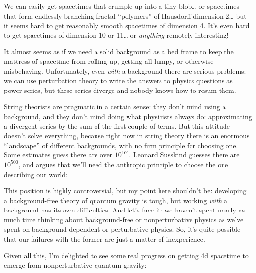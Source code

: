 \documentclass{article}
\def\tightlist{}
\renewcommand{\texttt}[1]{%
  \begingroup
  \ttfamily
  \begingroup\lccode`~=`/\lowercase{\endgroup\def~}{/\discretionary{}{}{}}%
  \begingroup\lccode`~=`[\lowercase{\endgroup\def~}{[\discretionary{}{}{}}%
  \begingroup\lccode`~=`.\lowercase{\endgroup\def~}{.\discretionary{}{}{}}%
  \catcode`/=\active\catcode`[=\active\catcode`.=\active
  \scantokens{#1\noexpand}%
  \endgroup
}
\begin{document}
We can easily get spacetimes that crumple up into a tiny blob\ldots{} or
spacetimes that form endlessly branching fractal ``polymers'' of
Hausdorff dimension 2\ldots{} but it seems hard to get reasonably smooth
spacetimes of dimension 4. It's even hard to get spacetimes of dimension
10 or 11\ldots{} or \emph{anything} remotely interesting!

It almost seems as if we need a solid background as a bed frame to keep
the mattress of spacetime from rolling up, getting all lumpy, or
otherwise misbehaving. Unfortunately, even \emph{with} a background
there are serious problems: we can use perturbation theory to write the
answers to physics questions as power series, but these series diverge
and nobody knows how to resum them.

String theorists are pragmatic in a certain sense: they don't mind using
a background, and they don't mind doing what physicists always do:
approximating a divergent series by the sum of the first couple of
terms. But this attitude doesn't solve everything, because right now in
string theory there is an enormous ``landscape'' of different
backgrounds, with no firm principle for choosing one. Some estimates
guess there are over \(10^{100}\). Leonard Susskind guesses there are
\(10^{500}\), and argues that we'll need the anthropic principle to
choose the one describing our world:


This position is highly controversial, but my point here shouldn't be:
developing a background-free theory of quantum gravity is tough, but
working \emph{with} a background has its own difficulties. And let's
face it: we haven't spent nearly as much time thinking about
background-free or nonperturbative physics as we've spent on
background-dependent or perturbative physics. So, it's quite possible
that our failures with the former are just a matter of inexperience.

Given all this, I'm delighted to see some real progress on getting 4d
spacetime to emerge from nonperturbative quantum gravity:

\end{document}
